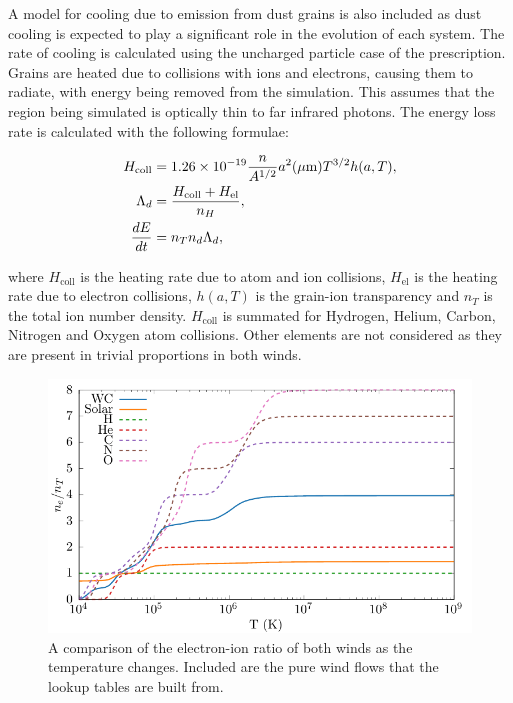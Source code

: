 A model for cooling due to emission from dust grains is also included as dust cooling is expected to play a significant role in the evolution of each system.
The rate of cooling is calculated using the uncharged particle case of the \textcite{dwek_infrared_1981} prescription.
Grains are heated due to collisions with ions and electrons, causing them to radiate, with energy being removed from the simulation.
This assumes that the region being simulated is optically thin to far infrared photons.
The energy loss rate is calculated with the following formulae:

\begin{subequations}
  \begin{align}
    H_\text{coll} & = 1.26 \times 10^{-19} \frac{n}{A^{1/2}} a^2(\mu \text m) T^{3/2} h(a,T) , \\
        \Lambda_d & = \frac{H_\text{coll} + H_\text{el}}{n_H} , \\
    \frac{dE}{dt} & = n_T n_d \Lambda_d ,
  \end{align}
\end{subequations}

\noindent
where $H_\text{coll}$ is the heating rate due to atom and ion collisions, $H_\text{el}$ is the heating rate due to electron collisions, $h(a,T)$ is the grain-ion transparency and $n_T$ is the total ion number density.
$H_\text{coll}$ is summated for Hydrogen, Helium, Carbon, Nitrogen and Oxygen atom collisions.
Other elements are not considered as they are present in trivial proportions in both winds.

\begin{figure}[h]
  \centering
  \includegraphics{assets/ionisation-fraction/ionisation-fraction.pdf}
  \caption[OB and WR electron-ion ratios]{A comparison of the electron-ion ratio of both winds as the temperature changes. Included are the pure wind flows that the lookup tables are built from.}
  \label{fig:electron-curve}
\end{figure}

